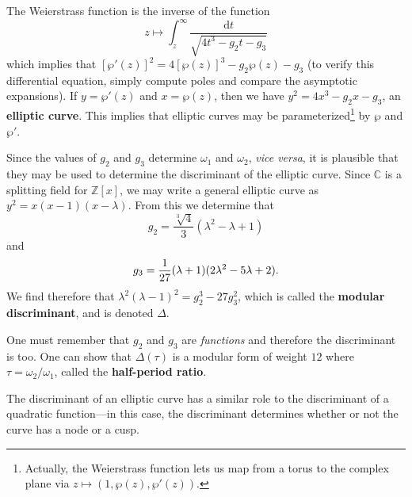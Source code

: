 \documentclass{microdoc}
\newcommand{\defn}[1]{\textbf{#1}}
\begin{document}
The Weierstrass function is the inverse of the
function
\[
z\mapsto\int_z^\infty\frac{\mathrm{d}t}{\sqrt{4t^3 -
    g_2t-g_3}}
\] which implies that $[\wp'(z)]^2=4[\wp(z)]^3-g_2\wp(z)-g_3$ (to
verify this differential equation, simply compute poles and compare
the asymptotic expansions). If $y=\wp'(z)$ and $x=\wp(z)$, then we
have $y^2=4x^3-g_2x-g_3$, an \defn{elliptic curve}. This implies that
elliptic curves may be parameterized\footnote{Actually, the
  Weierstrass function lets us map from a torus to the complex plane
  via $z\mapsto (1,\wp(z),\wp'(z))$.} by $\wp$ and $\wp'$.

Since the values of $g_2$ and $g_3$ determine $\omega_1$ and
$\omega_2$, \textit{vice versa}, it is plausible that they may be used
to determine the discriminant of the elliptic curve. Since
$\mathbb{C}$ is a splitting field for $\mathbb{Z}[x]$, we may write
a general elliptic curve as $y^2=x(x-1)(x-\lambda)$. From this we
determine that \[g_2=\frac{\sqrt[3]{4}}{3}(\lambda^2-\lambda+1)\]
and \[g_3=\frac{1}{27}(\lambda+1)(2\lambda^2-5\lambda+2)\text.\] We
find therefore that $\lambda^2(\lambda-1)^2=g_2^3 - 27g_3^2$, which is
called the \defn{modular discriminant}, and is denoted $\Delta$.

One must remember that $g_2$ and $g_3$ are \emph{functions} and
therefore the discriminant is too. One can show that $\Delta(\tau)$ is
a modular form of weight $12$ where $\tau=\omega_2/\omega_1$, called
the \defn{half-period ratio}.

The discriminant of an elliptic curve has a similar role to the
discriminant of a quadratic function---in this case, the discriminant
determines whether or not the curve has a node or a cusp.
\end{document}
